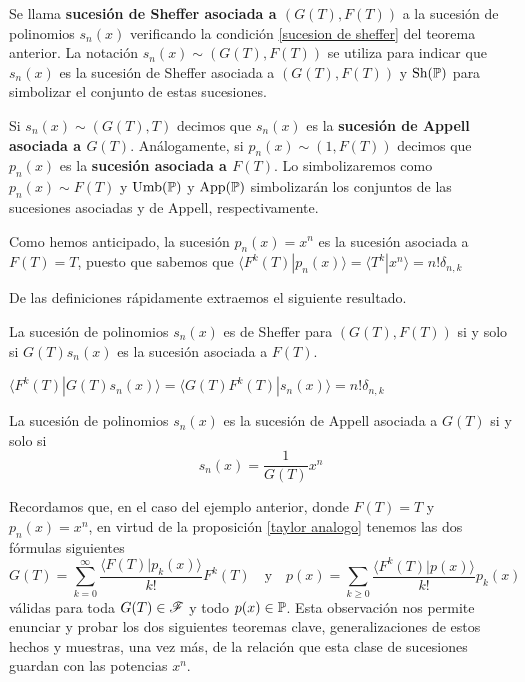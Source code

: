\begin{definicion}
    Se llama \textbf{sucesión de Sheffer asociada a $(G(T), F(T))$} a la sucesión de polinomios $s_n(x)$ verificando la condición \eqref{sucesion de sheffer} del teorema anterior. La notación $s_n(x) \sim (G(T), F(T))$ se utiliza para indicar que $s_n(x)$ es la sucesión de Sheffer asociada a $(G(T), F(T))$ y $\operatorname*{Sh(\mathbb{P})}$ para simbolizar el conjunto de estas sucesiones.
\end{definicion}
\begin{definicion}
    Si $s_n(x) \sim (G(T), T)$ decimos que $s_n(x)$ es la \textbf{sucesión de Appell asociada a $G(T)$}. Análogamente, si $p_n(x) \sim (1, F(T))$ decimos que $p_n(x)$ es la \textbf{sucesión asociada a $F(T)$}. Lo simbolizaremos como $p_n(x) \sim F(T)$ y $\operatorname*{Umb(\mathbb{P})}$ y $\operatorname*{App(\mathbb{P})}$ simbolizarán los conjuntos de las sucesiones asociadas y de Appell, respectivamente.
\end{definicion}

\begin{ej}
    Como hemos anticipado, la sucesión $p_n(x) = x^n$ es la sucesión asociada a $F(T) = T$, puesto que sabemos que $\langle F^k(T) | p_n(x) \rangle = \langle T^k | x^n \rangle = n! \delta_{n,k}$
\end{ej}

De las definiciones rápidamente extraemos el siguiente resultado.

\begin{teorema}\label{relacion sheffer y asociada}
    La sucesión de polinomios $s_n(x)$ es de Sheffer para $(G(T), F(T))$ si y solo si $G(T)s_n(x)$ es la sucesión asociada a $F(T)$. 
\end{teorema}

\begin{demo}
    $\langle F^k(T)| G(T)s_n(x) \rangle = \langle G(T)F^k(T)| s_n(x) \rangle = n!\delta_{n,k}$
\end{demo}

\begin{corolario}\label{relacion appell y asociada}
    La sucesión de polinomios $s_n(x)$ es la sucesión de Appell asociada a $G(T)$ si y solo si 
    \begin{equation*}
        s_n(x) = \frac{1}{G(T)} x^n
    \end{equation*}
\end{corolario}

Recordamos que, en el caso del ejemplo anterior, donde $F(T) = T$ y $p_n(x) = x^n$, en virtud de la proposición \ref{taylor analogo} tenemos las dos fórmulas siguientes 
\begin{equation*}
    G(T) = \sum_{k = 0}^\infty \frac{\langle F(T)| p_k(x)\rangle}{k!} F^k(T) \quad \text{y} \quad p(x) = \sum_{k \geq 0} \frac{\langle F^k(T) | p(x) \rangle}{k!}p_k(x)
\end{equation*}
válidas para toda $G(T) \in \mathscr{F}$ y todo $p(x) \in \mathbb{P}$. Esta observación nos permite enunciar y probar los dos siguientes teoremas clave, generalizaciones de estos hechos y muestras, una vez más, de la relación que esta clase de sucesiones guardan con las potencias $x^n$.

